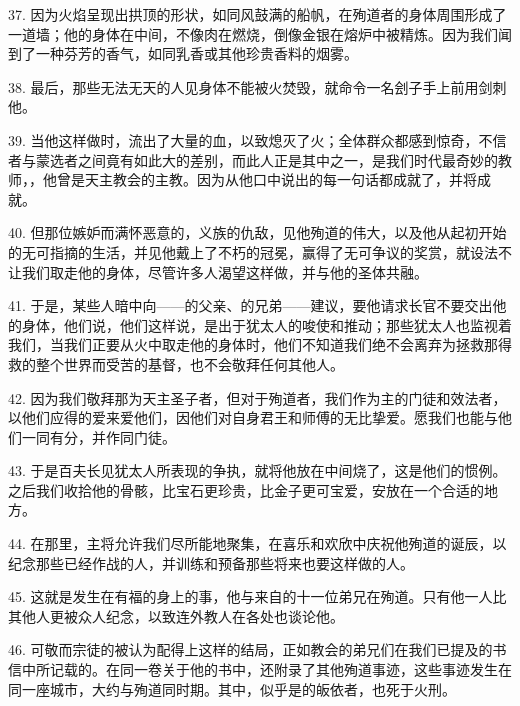 37. 因为火焰呈现出拱顶的形状，如同风鼓满的船帆，在殉道者的身体周围形成了一道墙；他的身体在中间，不像肉在燃烧，倒像金银在熔炉中被精炼。因为我们闻到了一种芬芳的香气，如同乳香或其他珍贵香料的烟雾。\par

38. 最后，那些无法无天的人见身体不能被火焚毁，就命令一名刽子手上前用剑刺他。\par

39. 当他这样做时，流出了大量的血，以致熄灭了火；全体群众都感到惊奇，不信者与蒙选者之间竟有如此大的差别，而此人正是其中之一，是我们时代最奇妙的教师，，他曾是天主教会的主教。因为从他口中说出的每一句话都成就了，并将成就。\par

40. 但那位嫉妒而满怀恶意的，义族的仇敌，见他殉道的伟大，以及他从起初开始的无可指摘的生活，并见他戴上了不朽的冠冕，赢得了无可争议的奖赏，就设法不让我们取走他的身体，尽管许多人渴望这样做，并与他的圣体共融。\par

41. 于是，某些人暗中向——的父亲、的兄弟——建议，要他请求长官不要交出他的身体，他们说，他们这样说，是出于犹太人的唆使和推动；那些犹太人也监视着我们，当我们正要从火中取走他的身体时，他们不知道我们绝不会离弃为拯救那得救的整个世界而受苦的基督，也不会敬拜任何其他人。\par

42. 因为我们敬拜那为天主圣子者，但对于殉道者，我们作为主的门徒和效法者，以他们应得的爱来爱他们，因他们对自身君王和师傅的无比挚爱。愿我们也能与他们一同有分，并作同门徒。\par

43. 于是百夫长见犹太人所表现的争执，就将他放在中间烧了，这是他们的惯例。之后我们收拾他的骨骸，比宝石更珍贵，比金子更可宝爱，安放在一个合适的地方。\par

44. 在那里，主将允许我们尽所能地聚集，在喜乐和欢欣中庆祝他殉道的诞辰，以纪念那些已经作战的人，并训练和预备那些将来也要这样做的人。\par

45. 这就是发生在有福的身上的事，他与来自的十一位弟兄在殉道。只有他一人比其他人更被众人纪念，以致连外教人在各处也谈论他。\par

46. 可敬而宗徒的被认为配得上这样的结局，正如教会的弟兄们在我们已提及的书信中所记载的。在同一卷关于他的书中，还附录了其他殉道事迹，这些事迹发生在同一座城市，大约与殉道同时期。其中，似乎是的皈依者，也死于火刑。\par

